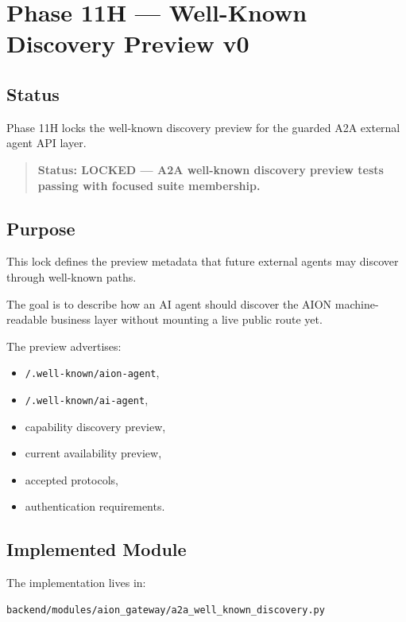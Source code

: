 \section{Phase 11H --- Well-Known Discovery Preview v0}
\label{sec:aion-a2a-well-known-discovery-preview-v0}

\subsection{Status}

Phase 11H locks the well-known discovery preview for the guarded A2A external agent API layer.

\begin{quote}
\textbf{Status: LOCKED --- A2A well-known discovery preview tests passing with focused suite membership.}
\end{quote}

\subsection{Purpose}

This lock defines the preview metadata that future external agents may discover through well-known paths.

The goal is to describe how an AI agent should discover the AION machine-readable business layer without mounting a live public route yet.

The preview advertises:

\begin{itemize}
  \item \texttt{/.well-known/aion-agent},
  \item \texttt{/.well-known/ai-agent},
  \item capability discovery preview,
  \item current availability preview,
  \item accepted protocols,
  \item authentication requirements.
\end{itemize}

\subsection{Implemented Module}

The implementation lives in:

\begin{verbatim}
backend/modules/aion_gateway/a2a_well_known_discovery.py
\end{verbatim}

